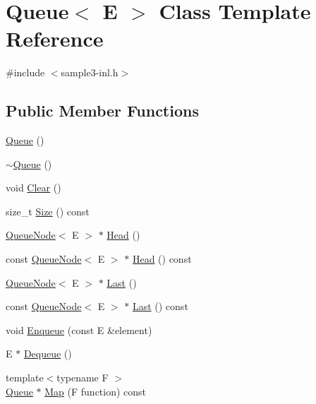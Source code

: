 \hypertarget{class_queue}{\section{Queue$<$ E $>$ Class Template Reference}
\label{class_queue}
}


{\ttfamily \#include $<$sample3-\/inl.\-h$>$}

\subsection*{Public Member Functions}
\begin{DoxyCompactItemize}
\item 
\hyperlink{class_queue_ab09891e54b51dc677ee6efb350687ae4}{Queue} ()
\item 
\hyperlink{class_queue_a49fe82adb8dc2fb62ab53876a6933d0f}{$\sim$\-Queue} ()
\item 
void \hyperlink{class_queue_acfdd5f9f7e936ca30dcf877370ef9510}{Clear} ()
\item 
size\-\_\-t \hyperlink{class_queue_a8d69a34b2dfccbf1343b7fc4ba35da90}{Size} () const 
\item 
\hyperlink{class_queue_node}{Queue\-Node}$<$ E $>$ $\ast$ \hyperlink{class_queue_a71aa0154ef75bb87a53b6af1829fcd5e}{Head} ()
\item 
const \hyperlink{class_queue_node}{Queue\-Node}$<$ E $>$ $\ast$ \hyperlink{class_queue_a877051b27c1c844ab5d5455116a54e57}{Head} () const 
\item 
\hyperlink{class_queue_node}{Queue\-Node}$<$ E $>$ $\ast$ \hyperlink{class_queue_a430aca3d3b9f5fd588b215028d134b74}{Last} ()
\item 
const \hyperlink{class_queue_node}{Queue\-Node}$<$ E $>$ $\ast$ \hyperlink{class_queue_a9b162059e84011b0088b22fc6dc8d188}{Last} () const 
\item 
void \hyperlink{class_queue_abaa2e7175457307bca74f5562cbdaaa9}{Enqueue} (const E \&element)
\item 
E $\ast$ \hyperlink{class_queue_a434d465001c3078e999f7a89a8af84c0}{Dequeue} ()
\item 
{\footnotesize template$<$typename F $>$ }\\\hyperlink{class_queue}{Queue} $\ast$ \hyperlink{class_queue_a7cb2f6585319ba1fd19d2347d95e71c1}{Map} (F function) const 
\end{DoxyCompactItemize}


